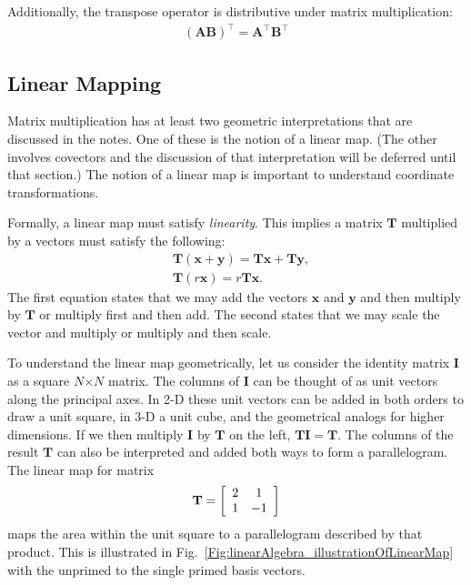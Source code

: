 Additionally, the transpose operator is distributive under matrix multiplication:
\begin{align}
  ( \mathbf{AB} )^\top = \mathbf{A}^\top \mathbf{B}^\top
\end{align}

\subsection{Linear Mapping}

Matrix multiplication has at least two geometric interpretations that are discussed in the notes. One of these is the notion of a linear map. (The other involves covectors and the discussion of that interpretation will be deferred until that section.) The notion of a linear map is important to understand coordinate transformations.

Formally, a linear map must satisfy \emph{linearity}. This implies a matrix $\mathbf{T}$ multiplied by a vectors must satisfy the following:
\begin{subequations}
\begin{align}
  &\mathbf{T}( \mathbf{x} + \mathbf{y} ) = \mathbf{Tx} + \mathbf{Ty}, \\
  &\mathbf{T}( r \mathbf{x} ) = r \mathbf{Tx}.
\end{align}
\end{subequations}
The first equation states that we may add the vectors $\mathbf{x}$ and $\mathbf{y}$ and then multiply by $\mathbf{T}$ or multiply first and then add. The second states that we may scale the vector and multiply or multiply and then scale.

To understand the linear map geometrically, let us consider the identity matrix $\mathbf{I}$ as a square $N$$\times$$N$ matrix. The columns of $\mathbf{I}$ can be thought of as unit vectors along the principal axes. In 2-D these unit vectors can be added in both orders to draw a unit square, in 3-D a unit cube, and the geometrical analogs for higher dimensions. If we then multiply $\mathbf{I}$ by $\mathbf{T}$ on the left, $\mathbf{TI} = \mathbf{T}$. The columns of the result $\mathbf{T}$ can also be interpreted and added both ways to form a parallelogram. The linear map for matrix
\begin{align}
  \mathbf{T} = 
  \left[ \begin{array}{c c}  2 &  1 \\
  							 1 & -1 \\ \end{array} \right] \nonumber
\end{align}
 maps the area within the unit square to a parallelogram described by that product. This is illustrated in Fig.~\ref{Fig:linearAlgebra_illustrationOfLinearMap} with the unprimed to the single primed basis vectors.
 
